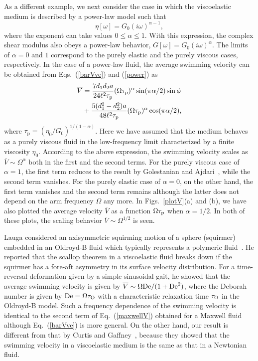 \documentclass[nofootinbib,twocolumn,showpacs,preprintnumbers,pre,aps]{revtex4-1}
\begin{document}
As a different example, we next consider the case in which the viscoelastic medium is 
described by a power-law model such that~\cite{Granek11,Komura12,Komura15}
\begin{equation}
\eta[\omega]=G_0(i\omega)^{\alpha-1},
\label{power}
\end{equation}
where the exponent can take values $0 \le \alpha \le 1$.
With this expression, the complex shear modulus also obeys a  
power-law behavior, $G[\omega]=G_0(i\omega)^\alpha$.
The limits of $\alpha=0$ and $1$ correspond to the purely elastic and the purely viscous cases, 
respectively.
In the case of a power-law fluid, the average swimming velocity can be obtained from 
Eqs.~(\ref{barVve}) and (\ref{power}) as 
\begin{align}
\overline{V} & =\frac{7 d_1d_2a}{24 \ell^2\tau_{\rm p}}
(\Omega\tau_{\rm p})^\alpha\sin(\pi\alpha/2)\sin \phi \nonumber\\
&+\frac{5(d_1^2-d_2^2)a}{48\ell^2\tau_{\rm p}}
(\Omega\tau_{\rm p})^\alpha\cos(\pi\alpha/2),
\label{barVpow}
\end{align}
where $\tau_{\mathrm{p}}=(\eta_0/G_0)^{1/(1-\alpha)}$. 
Here we have assumed that the medium behaves as a purely viscous fluid in the 
low-frequency limit characterized by a finite viscosity $\eta_0$.
According to the above expression, the swimming velocity scales as 
$\overline{V} \sim \Omega^\alpha$ both in the first and the second terms.
For the purely viscous case of $\alpha=1$, the first term reduces to the result by 
Golestanian and Ajdari~\cite{Golestanian08}, while the second term vanishes. 
For the purely elastic case of $\alpha=0$, on the other hand, the first term vanishes
and the second term remains although the latter does not depend on the arm frequency 
$\Omega$ any more.
In Figs.~\ref{plotV}(a) and (b), we have also plotted the average velocity 
$\overline{V}$ as a function $\Omega \tau_{\rm p}$ when $\alpha=1/2$.
In both of these plots, the scaling behavior $\overline{V}\sim\Omega^{1/2}$ is seen.


Lauga considered an axisymmetric squirming motion of a sphere (squirmer) 
embedded in an Oldroyd-B fluid which typically represents a polymeric fluid~\cite{Lauga09}. 
He reported that the scallop theorem in a viscoelastic fluid breaks down if the squirmer
has a fore-aft asymmetry in its surface velocity distribution.
For a time-reversal deformation given by a simple sinusoidal gait, he showed 
that the average swimming velocity is given by 
$\overline{V} \sim\Omega {\rm De}/(1+{\rm De}^2)$, where the Deborah number
is given by ${\rm De}=\Omega \tau_{\rm O}$ with a characteristic relaxation time
$\tau_{\rm O}$ in the Oldroyd-B model.
Such a frequency dependence of the swimming velocity is identical to the second term 
of  Eq.~(\ref{maxwellV}) obtained for a Maxwell fluid although Eq.~(\ref{barVve}) 
is more general.
On the other hand, our result is different from that by Curtis and Gaffney~\cite{Curtis13},
because they showed that the swimming velocity in a viscoelastic medium is the same as 
that in a Newtonian fluid.
\end{document}
